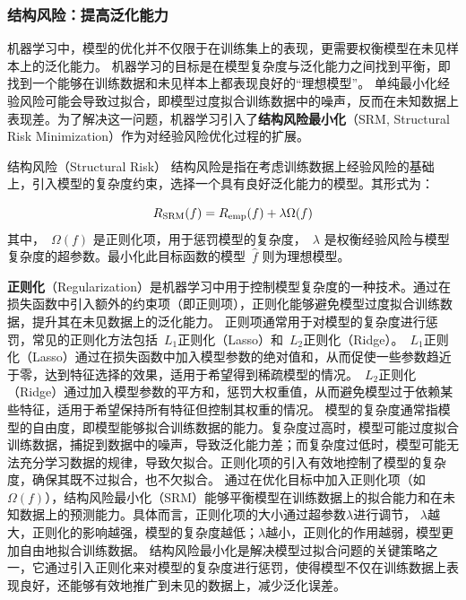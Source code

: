 \subsubsection{ 结构风险：提高泛化能力}

机器学习中，模型的优化并不仅限于在训练集上的表现，更需要权衡模型在未见样本上的泛化能力。
机器学习的目标是在模型复杂度与泛化能力之间找到平衡，即找到一个能够在训练数据和未见样本上都表现良好的“理想模型”。
单纯最小化经验风险可能会导致过拟合，即模型过度拟合训练数据中的噪声，反而在未知数据上表现差。为了解决这一问题，机器学习引入了{\bf 结构风险最小化}（SRM, Structural Risk Minimization）作为对经验风险优化过程的扩展。

\begin{definition}[]{结构风险（Structural Risk）}
结构风险是指在考虑训练数据上经验风险的基础上，引入模型的复杂度约束，选择一个具有良好泛化能力的模型。其形式为：

\begin{equation}\label{eq:SRM}
R_{\rm SRM}(f) = R_{\rm emp}(f) +\lambda \Omega(f)
\end{equation}
其中，~$\Omega(f)$ 是正则化项，用于惩罚模型的复杂度，~$\lambda$ 是权衡经验风险与模型复杂度的超参数。最小化此目标函数的模型~$\hat{f}$ 则为理想模型。
\end{definition}
{\bf 正则化}（Regularization）是机器学习中用于控制模型复杂度的一种技术。通过在损失函数中引入额外的约束项（即正则项），正则化能够避免模型过度拟合训练数据，提升其在未见数据上的泛化能力。
正则项通常用于对模型的复杂度进行惩罚，常见的正则化方法包括~$L_1$正则化（Lasso）和~$L_2$正则化（Ridge）。~$L_1$正则化（Lasso）通过在损失函数中加入模型参数的绝对值和，从而促使一些参数趋近于零，达到特征选择的效果，适用于希望得到稀疏模型的情况。~$L_2$正则化（Ridge）通过加入模型参数的平方和，惩罚大权重值，从而避免模型过于依赖某些特征，适用于希望保持所有特征但控制其权重的情况。
模型的复杂度通常指模型的自由度，即模型能够拟合训练数据的能力。复杂度过高时，模型可能过度拟合训练数据，捕捉到数据中的噪声，导致泛化能力差；而复杂度过低时，模型可能无法充分学习数据的规律，导致欠拟合。正则化项的引入有效地控制了模型的复杂度，确保其既不过拟合，也不欠拟合。
通过在优化目标中加入正则化项（如$ \Omega(f) $），结构风险最小化（SRM）能够平衡模型在训练数据上的拟合能力和在未知数据上的预测能力。具体而言，正则化项的大小通过超参数$\lambda$进行调节，
$\lambda$越大，正则化的影响越强，模型的复杂度越低；$\lambda$越小，正则化的作用越弱，模型更加自由地拟合训练数据。
结构风险最小化是解决模型过拟合问题的关键策略之一，它通过引入正则化来对模型的复杂度进行惩罚，使得模型不仅在训练数据上表现良好，还能够有效地推广到未见的数据上，减少泛化误差。
